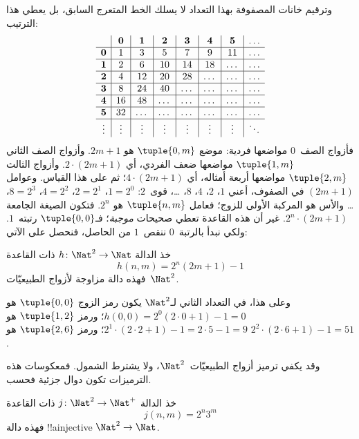 \documentclass[../../../include/open-logic-section]{subfiles}
\begin{document}
\begin{explain}
وترقيم خانات المصفوفة بهذا التعداد لا يسلك الخط المتعرج السابق،
بل يعطي هذا الترتيب:
\[
\begin{array}{ c | c | c | c | c | c | c | c }
& \mathbf 0 & \mathbf 1 & \mathbf 2 & \mathbf 3 & \mathbf 4 & \mathbf 5 & \dots \\
\hline
\mathbf 0 & 1 & 3 & 5 & 7 & 9 & 11 & \dots \\
\hline
\mathbf 1 & 2 & 6 & 10 & 14 & 18 & \dots & \dots \\
\hline
\mathbf 2 & 4 & 12 & 20 & 28 & \dots & \dots & \dots \\
\hline
\mathbf 3 & 8 & 24 & 40 & \dots & \dots & \dots & \dots \\
\hline
\mathbf 4 & 16 & 48 & \dots & \dots & \dots & \dots & \dots \\
\hline
\mathbf 5 & 32 & \dots & \dots & \dots & \dots & \dots & \dots \\
\hline
\vdots & \vdots & \vdots & \vdots & \vdots & \vdots & \vdots & \ddots\\
\end{array}
\]
فأزواج الصف~$0$ مواضعها فردية: موضع $\tuple{0,m}$ هو $2m+1$.
وأزواج الصف الثاني $\tuple{1,m}$ مواضعها ضعف الفردي، أي
$2 \cdot (2m+1)$. وأزواج الثالث $\tuple{2,m}$ مواضعها أربعة
أمثاله، أي $4 \cdot (2m+1)$؛ ثم على هذا القياس. وعوامل
$(2m+1)$ في الصفوف، أعني $1$، $2$، $4$، $8$، \dots، قوى~$2$:
$1= 2^0$، $2 = 2^1$، $4 = 2^2$، $8 = 2^3$، \dots\@
والأس هو المركبة الأولى للزوج؛ فعامل $\tuple{n,m}$ هو $2^n$.
فتكون الصيغة الجامعة $2^n \cdot (2m+1)$. غير أن هذه القاعدة
تعطي صحيحات \emph{موجبة}؛ فـ$\tuple{0,0}$ رتبته~$1$.
ولكي نبدأ بالرتبة~$0$ ننقص~$1$ من الحاصل، فنحصل على الآتي:
\end{explain}

\begin{ex}
خذ الدالة $h\colon \Nat^2 \to \Nat$ ذات القاعدة
\[
h(n,m) = 2^n (2m+1) - 1
\]
فهذه دالة مزاوجة لأزواج الطبيعيّات~$\Nat^2$.
\end{ex}

\begin{explain}
وعلى هذا، في التعداد الثاني لـ$\Nat^2$ يكون رمز الزوج
$\tuple{0,0}$ هو $h(0,0) = 2^0(2\cdot 0+1) - 1 = 0$؛
ورمز $\tuple{1,2}$ هو $2^{1} \cdot (2 \cdot 2 + 1) - 1 = 2
\cdot 5 - 1 = 9$؛ ورمز $\tuple{2,6}$ هو $2^{2} \cdot (2
\cdot 6 + 1) - 1 = 51$.
\end{explain}

وقد يكفي ترميز أزواج الطبيعيّات~$\Nat^2$، ولا يشترط الشمول.
فمعكوسات هذه الترميزات تكون دوال جزئية فحسب.

\begin{ex}
خذ الدالة $j\colon \Nat^2 \to \Nat^+$ ذات القاعدة
\[
j(n,m) = 2^n3^m
\]
فهذه دالة !!a{injective} $\Nat^2 \to \Nat$.
\end{ex}
\end{document}
